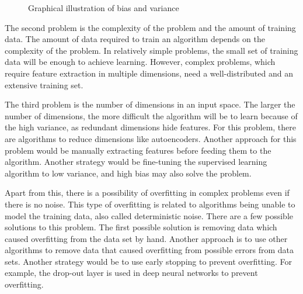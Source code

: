 \begin{figure}[htbp]
\centering
{}
\caption{Graphical illustration of bias and variance \cite{biasandvarianceillustration}}
\label{fig:BiasAndVariance}
\end{figure}

The second problem is the complexity of the problem and the amount of training data. The amount of data required to train an algorithm depends on the complexity of the problem. In relatively simple problems, the small set of training data will be enough to achieve learning. However, complex problems, which require feature extraction in multiple dimensions, need a well-distributed and an extensive training set.

The third problem is the number of dimensions in an input space. The larger the number of dimensions, the more difficult the algorithm will be to learn because of the high variance, as redundant dimensions hide features. For this problem, there are algorithms to reduce dimensions like autoencoders. Another approach for this problem would be manually extracting features before feeding them to the algorithm. Another strategy would be fine-tuning the supervised learning algorithm to low variance, and high bias may also solve the problem.

Apart from this, there is a possibility of overfitting in complex problems even if there is no noise. This type of overfitting is related to algorithms being unable to model the training data, also called deterministic noise. There are a few possible solutions to this problem. The first possible solution is removing data which caused overfitting from the data set by hand. Another approach is to use other algorithms to remove data that caused overfitting from possible errors from data sets. Another strategy would be to use early stopping to prevent overfitting. For example, the drop-out layer is used in deep neural networks to prevent overfitting.

